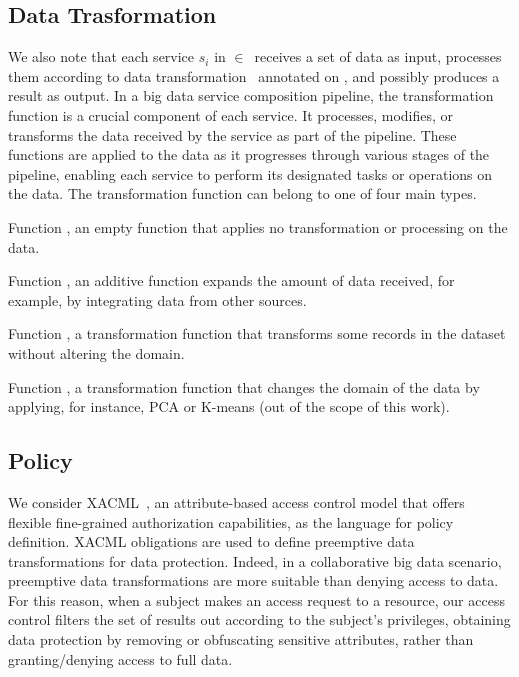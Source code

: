\subsection{Data Trasformation}
We also note that each service $s_i$ in $\in$\V\ receives a set of data as input, processes them according to data transformation \F\ annotated on , and possibly produces a result as output.
In a big data service composition pipeline, the transformation function is a crucial component of each service.
It processes, modifies, or transforms the data received by the service as part of the pipeline.
These functions are applied to the data as it progresses through various stages of the pipeline, enabling each service to perform its designated tasks or operations on the data.
The transformation function can belong to one of four main types.
\begin{enumerate*}[label=\roman*)]
  \item Function , an empty function that applies no transformation or processing on the data.
  \item Function , an additive function expands the amount of data received, for example, by integrating data from other sources.
  \item Function , a transformation function that transforms some records in the dataset without altering the domain.
  \item Function , a transformation function that changes the domain of the data by applying, for instance, PCA or K-means (out of the scope of this work).
\end{enumerate*}

\subsection{Policy}
We consider XACML~\cite{XACML}, an attribute-based access control model that offers flexible fine-grained authorization capabilities, as the language for policy definition. XACML obligations are used to define preemptive data transformations for data protection.
Indeed, in a collaborative big data scenario, preemptive data transformations are more suitable than denying access to data. For this reason, when a subject makes an access request to a resource, our access control filters the set of results out according to the subject's privileges, obtaining data protection by removing or obfuscating sensitive attributes, rather than granting/denying access to full data.

